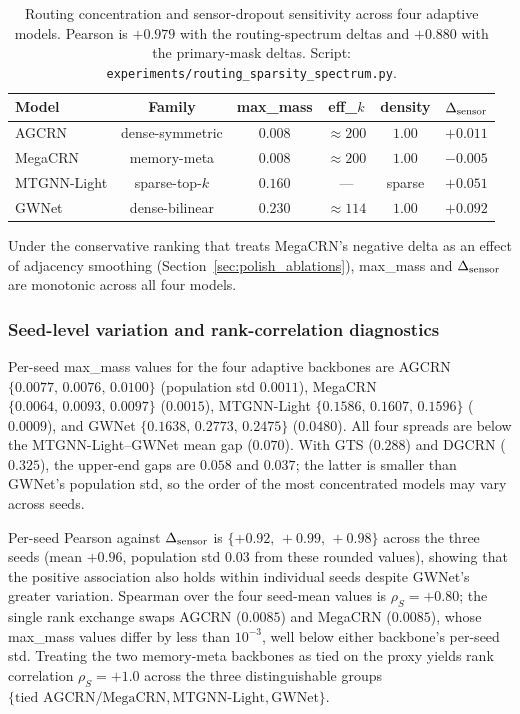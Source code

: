 \begin{table}[h]
\centering
\caption{Routing concentration and sensor-dropout sensitivity across four adaptive
models. Pearson is $+0.979$ with the routing-spectrum deltas and $+0.880$
with the primary-mask deltas. Script: \texttt{experiments/routing\_sparsity\_spectrum.py}.}
\label{tab:routing_spectrum}
\vskip 0.05in
\small
\begin{tabular}{lccccc}
\toprule
\textbf{Model} & \textbf{Family} & \textbf{max\_mass} & \textbf{eff\_$k$} & \textbf{density} & \textbf{$\Delta_{\text{sensor}}$} \\
\midrule
AGCRN        & dense-symmetric  & $0.008$ & $\approx 200$ & $1.00$ & ${+}0.011$ \\
MegaCRN      & memory-meta      & $0.008$ & $\approx 200$ & $1.00$ & ${-}0.005$ \\
MTGNN-Light  & sparse-top-$k$   & $0.160$ & ---           & sparse & ${+}0.051$ \\
GWNet        & dense-bilinear   & $0.230$ & $\approx 114$ & $1.00$ & ${+}0.092$ \\
\bottomrule
\end{tabular}
\end{table}

Under the conservative ranking that treats MegaCRN's negative delta as an
effect of adjacency smoothing (Section~\ref{sec:polish_ablations}), max\_mass
and $\Delta_{\text{sensor}}$ are monotonic across all four models.

\subsubsection{Seed-level variation and rank-correlation diagnostics}
\label{sec:appendix_routing_spectrum_seedvar}

Per-seed max\_mass values for the four adaptive backbones are AGCRN
$\{0.0077,\,0.0076,\,0.0100\}$ (population std $0.0011$), MegaCRN
$\{0.0064,\,0.0093,\,0.0097\}$ ($0.0015$), MTGNN-Light
$\{0.1586,\,0.1607,\,0.1596\}$ ($0.0009$), and GWNet
$\{0.1638,\,0.2773,\,0.2475\}$ ($0.0480$).
All four spreads are below the MTGNN-Light--GWNet mean gap ($0.070$).
With GTS ($0.288$) and DGCRN ($0.325$), the upper-end gaps are $0.058$ and
$0.037$; the latter is smaller than GWNet's population std, so the order of
the most concentrated models may vary across seeds.

Per-seed Pearson against $\Delta_{\text{sensor}}$ is $\{+0.92,\,+0.99,\,+0.98\}$ across
the three seeds (mean $+0.96$, population std $0.03$ from these rounded values), showing that the positive association also holds within individual seeds despite GWNet's greater variation. Spearman over the four
seed-mean values is $\rho_S{=}{+}0.80$; the single rank exchange swaps AGCRN
($0.0085$) and MegaCRN ($0.0085$), whose max\_mass values differ by less than
$10^{-3}$, well below either backbone's per-seed std. Treating the two
memory-meta backbones as tied on the proxy yields rank correlation
$\rho_S{=}{+}1.0$ across the three distinguishable groups
$\{\text{tied AGCRN/MegaCRN}, \text{MTGNN-Light}, \text{GWNet}\}$.

